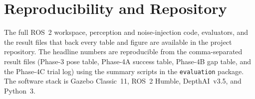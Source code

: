 \section{Reproducibility and Repository}\label{app:repro}
The full ROS~2 workspace, perception and noise-injection code, evaluators, and the result
files that back every table and figure are available in the project repository. The headline
numbers are reproducible from the comma-separated result files (Phase-3 pose table, Phase-4A
success table, Phase-4B gap table, and the Phase-4C trial log) using the summary scripts in
the \texttt{evaluation} package. The software stack is Gazebo Classic~11, ROS~2 Humble,
DepthAI~v3.5, and Python~3.
